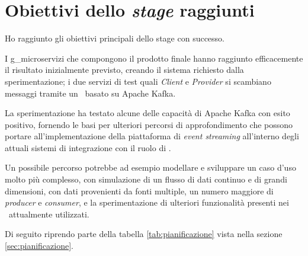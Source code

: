 \section{Obiettivi dello \textit{stage} raggiunti}

Ho raggiunto gli obiettivi principali dello stage con successo.

I \gls{g_microservizi} che compongono il prodotto finale hanno raggiunto efficacemente il risultato inizialmente previsto, creando il sistema richiesto dalla sperimentazione; i due servizi di test quali  \textit{Client} e  \textit{Provider} si scambiano messaggi tramite un \middleware\ basato su Apache Kafka.

La sperimentazione ha testato alcune delle capacità di Apache Kafka con esito positivo, fornendo le basi per ulteriori percorsi di approfondimento che possono portare all'implementazione della piattaforma di \textit{event streaming} all'interno degli attuali sistemi di integrazione con il ruolo di \middleware.

Un possibile percorso potrebbe ad esempio modellare e sviluppare un caso d'uso molto più complesso, con simulazione di un flusso di dati continuo e di grandi dimensioni, con dati provenienti da fonti multiple, un numero maggiore di \textit{producer} e \textit{consumer}, e la sperimentazione di ulteriori funzionalità presenti nei \middleware\ attualmente utilizzati.

\noindent
Di seguito riprendo parte della tabella \ref{tab:pianificazione} vista nella sezione \ref{sec:pianificazione}.

